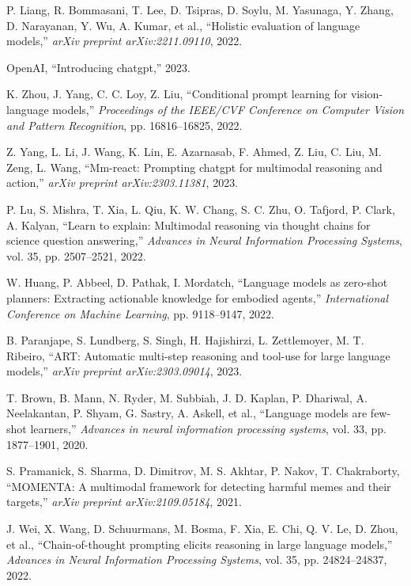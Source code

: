 \documentclass[conference]{IEEEtran}
\begin{document}
\begin{thebibliography}{00}
P. Liang, R. Bommasani, T. Lee, D. Tsipras, D. Soylu, M. Yasunaga, Y. Zhang, D. Narayanan, Y. Wu, A. Kumar, et al., ``Holistic evaluation of language models,'' \emph{arXiv preprint arXiv:2211.09110}, 2022.

OpenAI, ``Introducing chatgpt,'' 2023.

K. Zhou, J. Yang, C. C. Loy, Z. Liu, ``Conditional prompt learning for vision-language models,'' \emph{Proceedings of the IEEE/CVF Conference on Computer Vision and Pattern Recognition}, pp. 16816--16825, 2022.

Z. Yang, L. Li, J. Wang, K. Lin, E. Azarnasab, F. Ahmed, Z. Liu, C. Liu, M. Zeng, L. Wang, ``Mm-react: Prompting chatgpt for multimodal reasoning and action,'' \emph{arXiv preprint arXiv:2303.11381}, 2023.

P. Lu, S. Mishra, T. Xia, L. Qiu, K. W. Chang, S. C. Zhu, O. Tafjord, P. Clark, A. Kalyan, ``Learn to explain: Multimodal reasoning via thought chains for science question answering,'' \emph{Advances in Neural Information Processing Systems}, vol. 35, pp. 2507--2521, 2022.

W. Huang, P. Abbeel, D. Pathak, I. Mordatch, ``Language models as zero-shot planners: Extracting actionable knowledge for embodied agents,'' \emph{International Conference on Machine Learning}, pp. 9118--9147, 2022.

B. Paranjape, S. Lundberg, S. Singh, H. Hajishirzi, L. Zettlemoyer, M. T. Ribeiro, ``ART: Automatic multi-step reasoning and tool-use for large language models,'' \emph{arXiv preprint arXiv:2303.09014}, 2023.

T. Brown, B. Mann, N. Ryder, M. Subbiah, J. D. Kaplan, P. Dhariwal, A. Neelakantan, P. Shyam, G. Sastry, A. Askell, et al., ``Language models are few-shot learners,'' \emph{Advances in neural information processing systems}, vol. 33, pp. 1877--1901, 2020.

S. Pramanick, S. Sharma, D. Dimitrov, M. S. Akhtar, P. Nakov, T. Chakraborty, ``MOMENTA: A multimodal framework for detecting harmful memes and their targets,'' \emph{arXiv preprint arXiv:2109.05184}, 2021.

J. Wei, X. Wang, D. Schuurmans, M. Bosma, F. Xia, E. Chi, Q. V. Le, D. Zhou, et al., ``Chain-of-thought prompting elicits reasoning in large language models,'' \emph{Advances in Neural Information Processing Systems}, vol. 35, pp. 24824--24837, 2022.


\end{thebibliography}
\end{document}
